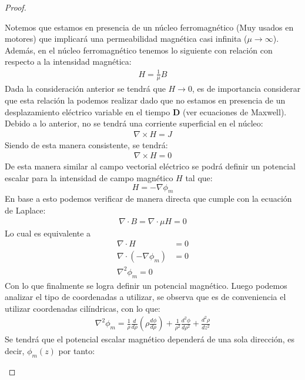 \begin{proof}
\begin{enumerate}
    Notemos que estamos en presencia de un núcleo ferromagnético (Muy usados en motores) que implicará una permeabilidad magnética casi infinita ($\mu \rightarrow \infty$). Además, en el núcleo ferromagnético tenemos lo siguiente con relación con respecto a la intensidad magnética: 
    \begin{align}
        H = \frac{1}{\mu} B 
    \end{align}
    Dada la consideración anterior se tendrá que $H \rightarrow 0 $, es de importancia considerar que esta relación la podemos realizar dado que no estamos en presencia de un desplazamiento eléctrico variable en el tiempo $\textbf{D}$ (ver ecuaciones de Maxwell). Debido a lo anterior, no se tendrá una corriente superficial en el núcleo: 
    \begin{align}
        \nabla \times H = J  
    \end{align}
    Siendo de esta manera consistente, se tendrá: 
    \begin{align}
        \nabla \times H = 0  
    \end{align}
    De esta manera similar al campo vectorial eléctrico se podrá definir un potencial escalar para la intensidad de campo magnético $H$ tal que:
    \begin{equation}
        H = -\nabla \phi_{m} 
    \end{equation}
    En base a esto podemos verificar de manera directa que cumple con la ecuación de Laplace:\\
    \begin{align}
        \nabla \cdot B = \nabla \cdot \mu H= 0 
    \end{align}
    Lo cual es equivalente a 
    \begin{align}
        \nabla \cdot H &= 0\\
        \nabla \cdot (-\nabla \phi_{m}) &= 0\\
        \nabla^{2} \phi_{m}= 0 
    \end{align}
    Con lo que finalmente se logra definir un potencial magnético. Luego podemos analizar el tipo de coordenadas a utilizar, se observa que es de conveniencia el utilizar coordenadas cilíndricas, con lo que:
    \begin{align}
        \nabla^{2}\phi_{m} = \frac{1}{\rho} \frac{d}{d\rho}\left(\rho \frac{d\phi}{d\rho}\right) + \frac{1}{\rho^{2}}\frac{d^{2}\phi}{d\rho^{2}} + \frac{d^{2}\rho}{dz^{2}}
    \end{align}
    Se tendrá que el potencial escalar magnético dependerá de una sola dirección, es decir, $\phi_{m}(z)$ por tanto:

\end{enumerate}
\end{proof}
